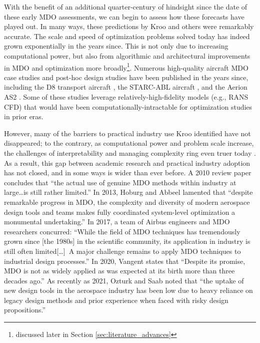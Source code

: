 With the benefit of an additional quarter-century of hindsight since the date of these early MDO assessments, we can begin to assess how these forecasts have played out. In many ways, these predictions by Kroo and others were remarkably accurate. The scale and speed of optimization problems solved today has indeed grown exponentially in the years since. This is not only due to increasing computational power, but also from algorithmic and architectural improvements in MDO and optimization more broadly\footnote{discussed later in Section \ref{sec:literature_advances}}. Numerous high-quality aircraft MDO case studies and post-hoc design studies have been published in the years since, including the D8 transport aircraft \cite{drela_development_2011, drela_tasopt_2010}, the STARC-ABL aircraft \cite{yildirim_performance_2021}, and the Aerion AS2 \cite{bons_highfidelity_2020}. Some of these studies leverage relatively-high-fidelity models (e.g., RANS CFD) that would have been computationally-intractable for optimization studies in prior eras.

However, many of the barriers to practical industry use Kroo identified have not disappeared; to the contrary, as computational power and problem scale increase, the challenges of interpretability and managing complexity ring even truer today \cite{antoine_framework_2005, gpkit, gazaix_industrialization_2017, torenbeek_advanced_2013}. As a result, this gap between academic research and practical industry adoption has not closed, and in some ways is wider than ever before. A 2010 review paper \cite{agte_mdo_2010} concludes that ``the actual use of genuine MDO methods within industry at large\dots is still rather limited.'' In 2013, Hoburg and Abbeel lamented that ``despite remarkable progress in MDO, the complexity and diversity of modern aerospace design tools and teams makes fully coordinated system-level optimization a monumental undertaking.'' \cite{hoburg_geometric_2014} In 2017, a team of Airbus engineers and MDO researchers concurred: ``While the field of MDO techniques has tremendously grown since [the 1980s] in the scientific community, its application in industry is still often limited[\dots]\ A major challenge remains to apply MDO techniques to industrial design processes.'' \cite{gazaix_industrialization_2017} In 2020, Vangent states that ``Despite its promise, MDO is not as widely applied as was expected at its birth more than three decades ago.'' \cite{vangent_knowledge_2020} As recently as 2021, Ozturk and Saab noted that ``the uptake of new design tools in the aerospace industry has been low due to heavy reliance on legacy design methods and prior experience when faced with risky design propositions.'' \cite{ozturk_optimal_2021}

